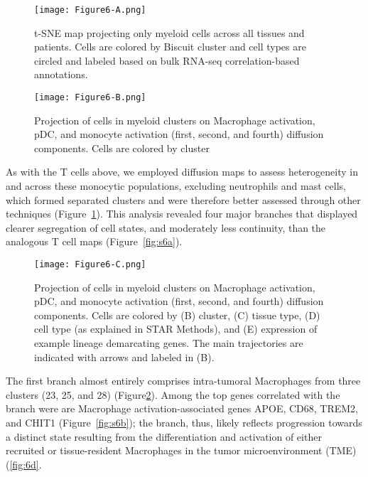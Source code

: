 \begin{figure}
\begin{minipage}{.5\textwidth}
  \centering
  \texttt{[image: Figure6-A.png]}
  \caption{t-SNE map projecting only myeloid cells across all tissues and patients. Cells are colored by Biscuit cluster and cell types are circled and labeled based on bulk RNA-seq correlation-based annotations.}
  \label{fig:6a}
\end{minipage}
\begin{minipage}{.5\textwidth}
  \centering
  \texttt{[image: Figure6-B.png]}
  \caption{Projection of cells in myeloid clusters on Macrophage activation, pDC, and monocyte activation (first, second, and fourth) diffusion components. Cells are colored by cluster}
  \label{fig:6b}
\end{minipage}
\end{figure}

As with the T cells above, we employed diffusion maps to assess heterogeneity in and across these monocytic populations, excluding neutrophils and mast cells, which formed separated clusters and were therefore better assessed through other techniques (Figure~\ref{fig:6b}).
This analysis revealed four major branches that displayed clearer segregation of cell states, and moderately less continuity, than the analogous T cell maps (Figure~\ref{fig:s6a}).

\begin{figure}
\centering
\texttt{[image: Figure6-C.png]}
\caption{Projection of cells in myeloid clusters on Macrophage activation, pDC, and monocyte activation (first, second, and fourth) diffusion components.
  Cells are colored by (B) cluster, (C) tissue type, (D) cell type (as explained in STAR Methods), and (E) expression of example lineage demarcating genes.
  The main trajectories are indicated with arrows and labeled in (B).
}
\label{fig:6c}
\end{figure}

The first branch almost entirely comprises intra-tumoral Macrophages from three clusters (23, 25, and 28) (Figure\ref{fig:6c}).
Among the top genes correlated with the branch were are Macrophage activation-associated genes APOE, CD68, TREM2, and CHIT1 (Figure~\ref{fig:s6b}); the branch, thus, likely reflects progression towards a distinct state resulting from the differentiation and activation of either recruited or tissue-resident Macrophages in the tumor microenvironment (TME) (\ref{fig:6d}. 


